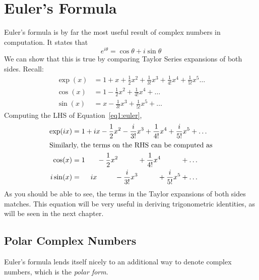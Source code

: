 \section{Euler's Formula}
Euler's formula is by far the most useful result of complex numbers in computation. It states that
\begin{equation}
	e^{i\theta} = \cos\theta + i\sin\theta \label{eq1:euler}
\end{equation}
We can show that this is true by comparing Taylor Series expansions of both sides. Recall:
\begin{align*}
	\exp(x) &= 1 + x + \frac{1}{2}x^2 + \frac{1}{3!} x^3+\frac{1}{4!}x^4+\frac{1}{5!}x^5\dots\\
	\cos(x) &= 1 - \frac{1}{2}x^2 + \frac{1}{4!}x^4+\dots\\
	\sin(x) &= x - \frac{1}{3!}x^3+\frac{1}{5!}x^5+\dots
\end{align*}
Computing the LHS of Equation~\ref{eq1:euler},
\begin{align*}
	\exp(ix) &= 1 + ix -\frac{1}{2}x^2 - \frac{i}{3!} x^3 + \frac{1}{4!}x^4 + \frac{i}{5!}x^5+\dots\\
	\intertext{Similarly, the terms on the RHS can be computed as}
	\cos(x)&=1\hphantom{+ix}-\frac{1}{2}x^2\hphantom{-\frac{i}{3!}x^3}+\frac{1}{4!}x^4\hphantom{+\frac{i}{5!}x^5}+\dots\\
	i\sin(x)&=\hphantom{1+}ix\hphantom{-\frac{1}{2}x^2}-\frac{i}{3!}x^3\hphantom{+\frac{1}{4!}x^4}+\frac{i}{5!}x^5+\dots
\end{align*}
As you should be able to see, the terms in the Taylor expansions of both sides matches. This equation will be very useful in deriving trigonometric identities, as will be seen in the next chapter.

\subsection{Polar Complex Numbers}
Euler's formula lends itself nicely to an additional way to denote complex numbers, which is the \emph{polar form}. 


